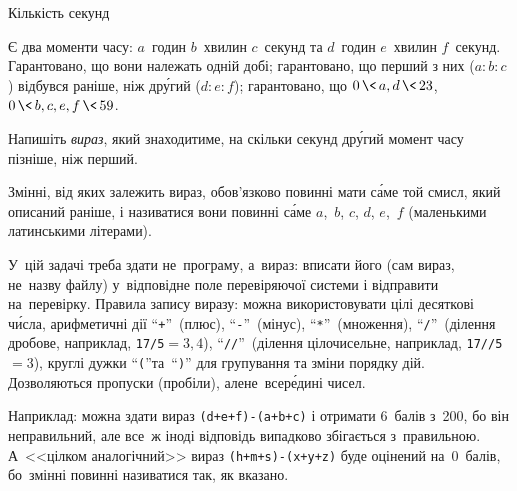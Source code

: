 {

\PrintEjudgeConstraintsfalse

\begin{problemAllDefault}{Кількість секунд}

Є два моменти часу: 
$a$~годин $b$~хвилин $c$~секунд та
$d$~годин $e$~хвилин $f$~секунд.
Гарантовано, що вони належать одній добі; 
гарантовано, що перший з них ($a:b:c$) відбувся раніше, ніж др\'{у}гий ($d:e:f$);
гарантовано, що 
${0\,{\<}\,a,d\,{\<}\,23}$, 
${0\,{\<}\,b,c,e,f\,{\<}\,59}$.

{

Напишіть \emph{вираз}, який знаходитиме, на скільки секунд др\'{у}гий момент часу пізніше, ніж перший. 

Змінні, від яких залежить вираз, обов'язково повинні мати с\'{а}ме той смисл, який описаний раніше, і називатися вони повинні с\'{а}ме $a$,~$b$, $c$, $d$, $e$,~$f$ (маленькими латинськими літерами).

У~цій задачі треба здати не~програму, а~вираз: 
вписати його (сам вираз, не~назву файлу) у~відповідне поле перевіряючої системи
і відправити на~перевірку. Правила запису виразу:
можна використовувати цілі десяткові ч\'{и}сла, арифметичні дії ``\verb"+"''~(плюс), 
``\verb"-"''~(мінус), ``\verb"*"''~(множення), ``\verb"/"''~(ділення дробове, наприклад, \verb"17/5"${=}3{,}4$), ``\verb"//"''~(ділення цілочисельне, наприклад, \verb"17//5"${=}3$), круглі дужки ``\verb"("''\nolinebreak[2] та~``\verb")"'' 
для групування та зміни порядку дій.
Дозволяються пропуски (пробіли), але\nolinebreak[3] не~всер\'{е}дині чисел.

Наприклад: можна здати вираз 
\verb"(d+e+f)-(a+b+c)" 
і отримати 6~балів з~200, бо він неправильний,
але все~ж іноді відповідь випадково збігається з~правильною. 
А~<<цілком аналогічний>> вираз 
\verb"(h+m+s)-(x+y+z)"
буде оцінений на~0~балів, 
бо~змінні повинні називатися так, як вказано.

}

\end{problemAllDefault}

}